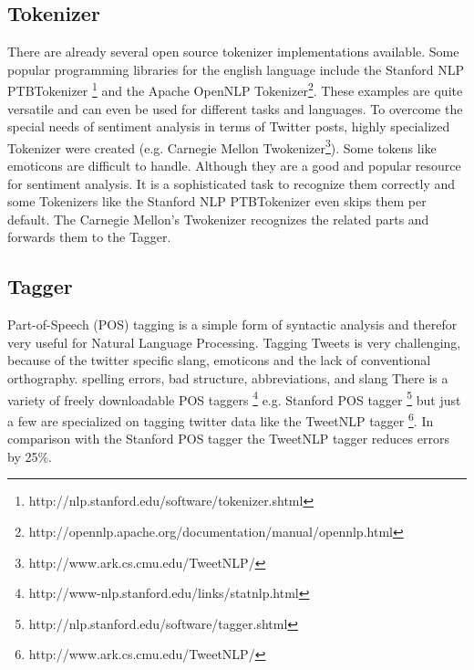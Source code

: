 \subsection{Tokenizer}
There are already several open source tokenizer implementations
available. Some popular programming libraries for the english 
language include the Stanford NLP PTBTokenizer
\footnote{http://nlp.stanford.edu/software/tokenizer.shtml} 
and the Apache OpenNLP Tokenizer\footnote{http://opennlp.apache.org/documentation/manual/opennlp.html}.
These examples are quite versatile and can even be
used for different tasks and languages.
To overcome the special needs of sentiment analysis in terms of Twitter posts,
highly specialized Tokenizer were created (e.g. Carnegie 
Mellon Twokenizer\footnote{http://www.ark.cs.cmu.edu/TweetNLP/}).
Some tokens like emoticons are difficult to handle. Although they 
are a good and popular resource for sentiment analysis. \autocite{emoticons}
It is a sophisticated task to recognize them correctly and some Tokenizers 
like the Stanford NLP PTBTokenizer even skips them per default. 
The Carnegie Mellon's Twokenizer recognizes the related parts and
forwards them to the Tagger.

\subsection{Tagger}
Part-of-Speech (POS) tagging is a simple form of syntactic analysis and therefor
very useful for Natural Language Processing.
Tagging Tweets is very challenging, because of the twitter specific slang, emoticons and the lack of conventional orthography.
spelling errors, bad structure, abbreviations, and slang
There is a variety of freely downloadable POS taggers
\footnote{http://www-nlp.stanford.edu/links/statnlp.html} e.g. Stanford POS tagger
\footnote{http://nlp.stanford.edu/software/tagger.shtml}
 but just a few are specialized on tagging twitter data like the TweetNLP tagger
\footnote{http://www.ark.cs.cmu.edu/TweetNLP/}. In comparison with the Stanford POS tagger the TweetNLP tagger
 reduces errors by 25\%.


